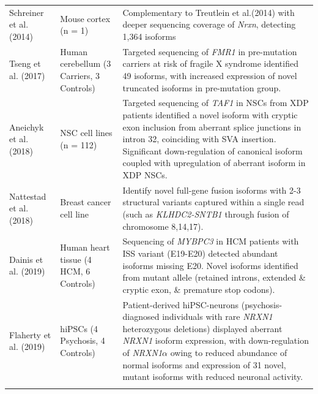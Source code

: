 \begin{landscape}
\begin{longtable}[c]{p{4cm}p{4cm}p{18cm}}
		\centering Schreiner et al. (2014)\cite{Schreiner2014} &
		\centering Mouse cortex (n = 1) &
		\tabitem Complementary to Treutlein et al.(2014) with deeper sequencing coverage of \textit{Nrxn}, detecting 1,364 isoforms\\
		\hdashline[0.5pt/5pt]
		
		\centering Tseng et al. (2017) \cite{Tseng2017} &
		\centering Human cerebellum \newline (3 Carriers, 3 Controls)  &
		\tabitem Targeted sequencing of \textit{FMR1} in pre-mutation carriers at risk of fragile X syndrome identified 49 isoforms, with increased expression of novel truncated isoforms in pre-mutation group. \\
		\hdashline[0.5pt/5pt]	
		
		\centering Aneichyk et al. (2018) \cite{Aneichyk2018} &
		\centering NSC cell lines (n = 112)  &
		\tabitem Targeted sequencing of \textit{TAF1} in NSCs from XDP patients identified a novel isoform with cryptic exon inclusion from aberrant splice junctions in intron 32, coinciding with SVA insertion. \newline
		\tabitem Significant down-regulation of canonical isoform coupled with upregulation of aberrant isoform in XDP NSCs.\\
		\hdashline[0.5pt/5pt]	
		
		\centering Nattestad et al. (2018) \cite{Nattestad2018} &
		\centering Breast cancer cell line  &
		\tabitem Identify novel full-gene fusion isoforms with 2-3 structural variants captured within a single read (such as \textit{KLHDC2-SNTB1} through fusion of chromosome 8,14,17). \\
		\hdashline[0.5pt/5pt]			
		
		\centering Dainis et al. (2019) \cite{Dainis2019} &
		\centering Human heart tissue (4 HCM, 6 Controls) &
		\tabitem Sequencing of \textit{MYBPC3} in HCM patients with ISS variant (E19-E20) detected abundant isoforms missing E20. \newline
		\tabitem Novel isoforms identified from mutant allele (retained introns, extended \& cryptic exon, \& premature stop codons).  \\
		
		\centering Flaherty et al. (2019) \cite{Flaherty2019} &
		\centering hiPSCs \newline (4 Psychosis, 4 Controls)  &
		\tabitem Patient-derived hiPSC-neurons (psychosis-diagnosed individuals with rare \textit{NRXN1} heterozygous deletions) displayed aberrant \textit{NRXN1} isoform expression, with down-regulation of \textit{NRXN1$\alpha$} owing to reduced abundance of normal isoforms and expression of 31 novel, mutant isoforms with reduced neuronal activity.  \\
		\hdashline[0.5pt/5pt]
		

\end{longtable}
\end{landscape}
